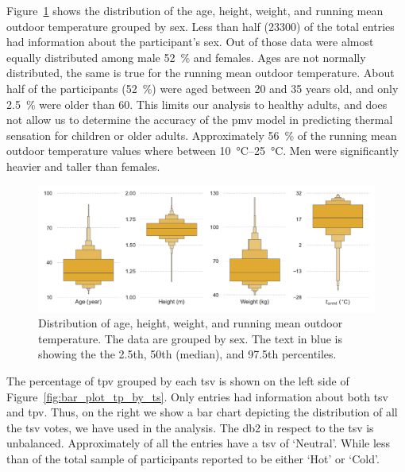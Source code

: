 Figure~\ref{fig:dist_other_data} shows the distribution of the age, height, weight, and running mean outdoor temperature grouped by sex.
Less than half (\num{23300}) of the total entries had information about the participant's sex.
Out of those data were almost equally distributed among male \qty{52}{\percent} and females.
Ages are not normally distributed, the same is true for the running mean outdoor temperature.
About half of the participants (\qty{52}{\percent}) were aged between \num{20} and \num{35} years old, and only \qty{2.5}{\percent} were older than 60.
This limits our analysis to healthy adults, and does not allow us to determine the accuracy of the \ac{pmv} model in predicting thermal sensation for children or older adults.
Approximately \qty{56}{\percent} of the running mean outdoor temperature values where between \qtyrange{10}{25}{\celsius}.
Men were significantly heavier and taller than females.

\begin{figure}[htb!]
    \centering
    \includegraphics[width=\textwidth]{figures/dist_other_data}
    \caption{Distribution of age, height, weight, and running mean outdoor temperature.
    The data are grouped by sex.
    The text in blue is showing the the 2.5th, 50th (median), and 97.5th percentiles.}
    \label{fig:dist_other_data}
\end{figure}

The percentage of \ac{tpv} grouped by each \ac{tsv} is shown on the left side of Figure~\ref{fig:bar_plot_tp_by_ts}.
Only  entries had information about both \ac{tsv} and \ac{tpv}.
Thus, on the right we show a bar chart depicting the distribution of all the \ac{tsv} votes, we have used in the analysis.
The \gls{db2} in respect to the \ac{tsv} is unbalanced.
Approximately  of all the entries have a \ac{tsv} of `Neutral'.
While less than  of the total sample of participants reported to be either `Hot' or `Cold'.

